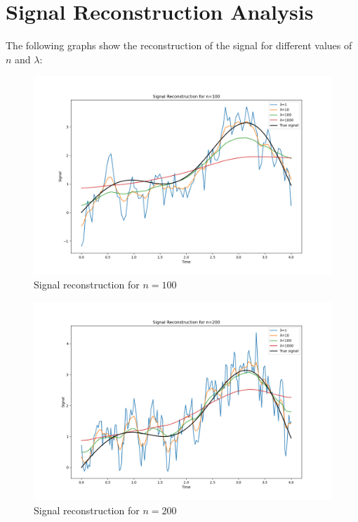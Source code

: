 \documentclass{article}
\begin{document}
\section*{Signal Reconstruction Analysis}
The following graphs show the reconstruction of the signal for different values of $n$ and $\lambda$:

\begin{figure}[h!]
\centering
\includegraphics[width=\textwidth]{signalplot_100.png}
\caption{Signal reconstruction for $n = 100$}
\end{figure}

\begin{figure}[h!]
\centering
\includegraphics[width=\textwidth]{signalplot_200.png}
\caption{Signal reconstruction for $n = 200$}
\end{figure}
\end{document}

